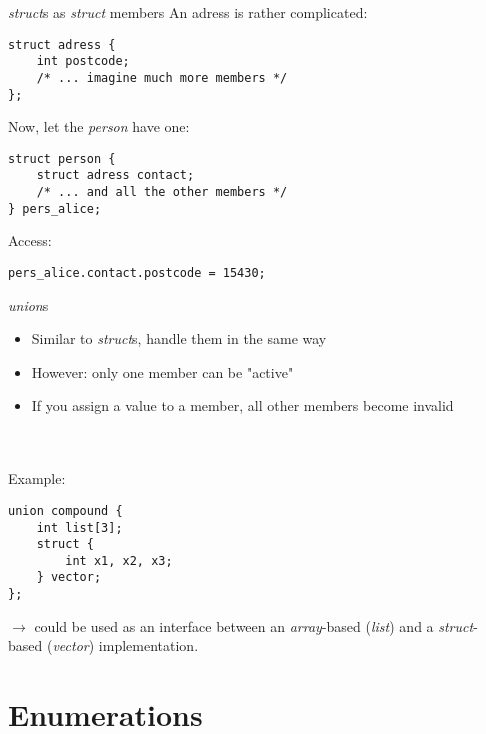 \begin{frame}[fragile]{\textit{struct}s as \textit{struct} members}
	An adress is rather complicated:
	\begin{lstlisting}[numbers=none]
struct adress {
	int postcode;
	/* ... imagine much more members */
};
\end{lstlisting}
	Now, let the \textit{person} have one:
	\begin{lstlisting}[numbers=none]
struct person {
	struct adress contact;
	/* ... and all the other members */
} pers_alice;
\end{lstlisting}
	Access:
\begin{lstlisting}[numbers=none]
pers_alice.contact.postcode = 15430;
\end{lstlisting}
\end{frame}
\begin{frame}[fragile]{\textit{union}s}
	\begin{itemize}
		\item Similar to \textit{struct}s, handle them in the same way
		\item However: only one member can be "active"
		\item If you assign a value to a member, all other members become invalid
	\end{itemize} \ \\ \ \\
	Example:
	\begin{lstlisting}[numbers=none]
union compound {
	int list[3];
	struct {
		int x1, x2, x3;
	} vector;
};
\end{lstlisting}
	$\rightarrow$ could be used as an interface between an \textit{array}-based (\textit{list}) and a \textit{struct}-based (\textit{vector}) implementation.
\end{frame}
\section{Enumerations}
